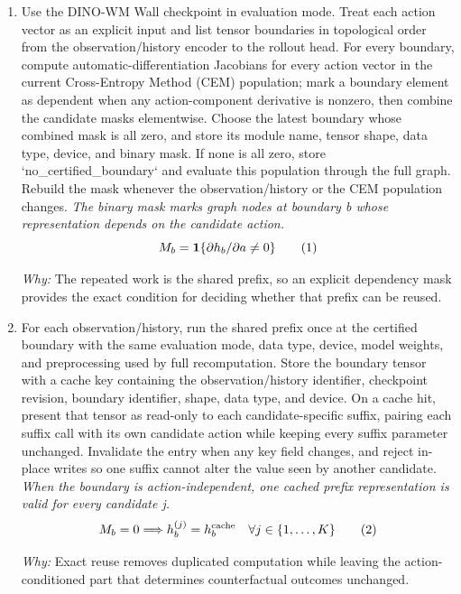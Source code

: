 \documentclass[10pt,a4paper]{article}
\begin{document}
\begin{enumerate}[leftmargin=*,start=1]
  \item Use the DINO-WM Wall checkpoint in evaluation mode. Treat each action vector as an explicit input and list tensor boundaries in topological order from the observation/history encoder to the rollout head. For every boundary, compute automatic-differentiation Jacobians for every action vector in the current Cross-Entropy Method (CEM) population;\allowbreak{} mark a boundary element as dependent when any action-component derivative is nonzero, then combine the candidate masks elementwise. Choose the latest boundary whose combined mask is all zero, and store its module name, tensor shape, data type, device, and binary mask. If none is all zero, store `no\_certified\_boundary` and evaluate this population through the full graph. Rebuild the mask whenever the observation/history or the CEM population changes.
\noindent\emph{The binary mask marks graph nodes at boundary b whose representation depends on the candidate action.}
\begin{equation}
\resizebox{\ifdim\width>\linewidth \linewidth\else\width\fi}{!}{$\displaystyle M_b = \mathbf{1}\{\partial h_b / \partial a \neq 0\}$} \tag{1}
\end{equation}
\par\emph{Why:} The repeated work is the shared prefix, so an explicit dependency mask provides the exact condition for deciding whether that prefix can be reused.
  \item For each observation/history, run the shared prefix once at the certified boundary with the same evaluation mode, data type, device, model weights, and preprocessing used by full recomputation. Store the boundary tensor with a cache key containing the observation/history identifier, checkpoint revision, boundary identifier, shape, data type, and device. On a cache hit, present that tensor as read-only to each candidate-specific suffix, pairing each suffix call with its own candidate action while keeping every suffix parameter unchanged. Invalidate the entry when any key field changes, and reject in-place writes so one suffix cannot alter the value seen by another candidate.
\noindent\emph{When the boundary is action-independent, one cached prefix representation is valid for every candidate j.}
\begin{equation}
\resizebox{\ifdim\width>\linewidth \linewidth\else\width\fi}{!}{$\displaystyle M_b=0 \Longrightarrow h_b^{(j)} = h_b^{\mathrm{cache}} \quad \forall j \in \{1,\ldots,K\}$} \tag{2}
\end{equation}
\par\emph{Why:} Exact reuse removes duplicated computation while leaving the action-conditioned part that determines counterfactual outcomes unchanged.
\end{enumerate}
\end{document}
